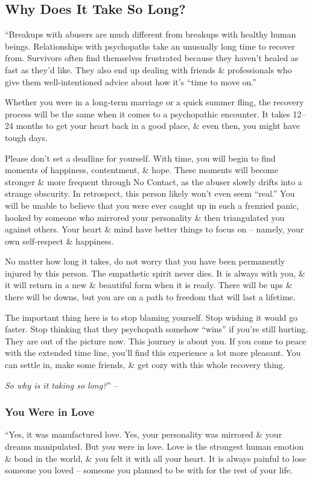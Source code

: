 \documentclass{article}
\numberwithin{equation}{section}
\begin{document}
\subsection{Why Does It Take So Long?}
``Breakups with abusers are much different from breakups with healthy human beings. Relationships with psychopaths take an unusually long time to recover from. Survivors often find themselves frustrated because they haven't healed as fast as they'd like. They also end up dealing with friends \& professionals who give them well-intentioned advice about how it's ``time to move on.''

Whether you were in a long-term marriage or a quick summer fling, the recovery process will be the same when it comes to a psychopathic encounter. It takes 12--24 months to get your heart back in a good place, \& even then, you might have tough days.

Please don't set a deadline for yourself. With time, you will begin to find moments of happiness, contentment, \& hope. These moments will become stronger \& more frequent through No Contact, as the abuser slowly drifts into a strange obscurity. In retrospect, this person likely won't even seem ``real.'' You will be unable to believe that you were ever caught up in such a frenzied panic, hooked by someone who mirrored your personality \& then triangulated you against others. Your heart \& mind have better things to focus on -- namely, your own self-respect \& happiness.

No matter how long it takes, do not worry that you have been permanently injured by this person. The empathetic spirit never dies. It is always with you, \& it will return in a new \& beautiful form when it is ready. There will be ups \& there will be downs, but you are on a path to freedom that will last a lifetime.

The important thing here is to stop blaming yourself. Stop wishing it would go faster. Stop thinking that they psychopath somehow ``wins'' if you're still hurting. They are out of the picture now. This journey is about you. If you come to peace with the extended time line, you'll find this experience a lot more pleasant. You can settle in, make some friends, \& get cozy with this whole recovery thing.

\textit{So why is it taking so long?}'' -- \cite[pp. 87--88]{MacKenzie2015}

\subsubsection{You Were in Love}
``Yes, it was manufactured love. Yes, your personality was mirrored \& your dreams manipulated. But you were in love. Love is the strongest human emotion \& bond in the world, \& you felt it with all your heart. It is always painful to lose someone you loved -- someone you planned to be with for the rest of your life.
\end{document}
